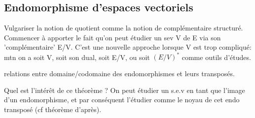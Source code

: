 \subsection{Endomorphisme d'espaces vectoriels}
\begin{definition}
\end{definition}

\begin{definition}
\end{definition}

\begin{proposition}
\end{proposition}

\begin{definition}
\end{definition}

\begin{definition}
\end{definition}

\begin{remark}
	Vulgariser la notion de quotient comme la notion de complémentaire structuré.
	Commencer à apporter le fait qu'on peut étudier un sev V de E via son 'complémentaire' E/V.
	C'est une nouvelle approche lorsque V est trop compliqué: mtn on a soit V, soit son dual, soit E/V, ou soit $(E/V)^*$ comme outils d'études.
\end{remark}

\begin{definition}
\end{definition}

\begin{definition}[]
	
\end{definition}

\begin{definition}
\end{definition}

\begin{theorem}
	relations entre domaine/codomaine des endomorphismes et leurs transposés.
\end{theorem}
\begin{remark}
	Quel est l'intérêt de ce théorème ?
	On peut étudier un s.e.v en tant que l'image d'un endomorphisme, et par conséquent
	l'étudier comme le noyau de cet endo transposé (cf théorème d'après).
\end{remark}

